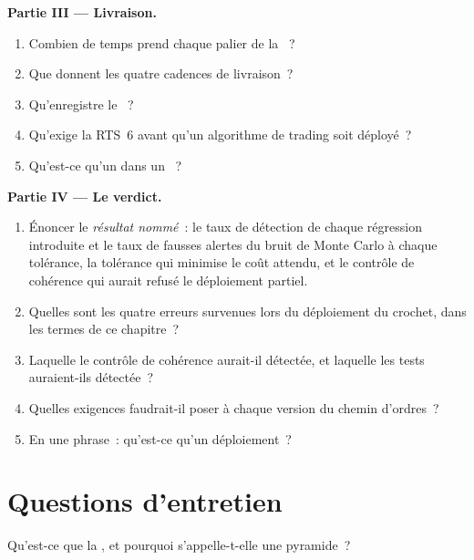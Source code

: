 \begin{problem}
\medskip\noindent\textbf{Partie III --- Livraison.}
\begin{enumerate}[resume]
\item Combien de temps prend chaque palier de la ~?
\item Que donnent les quatre cadences de livraison~?
\item Qu'enregistre le ~?
\item Qu'exige la RTS~6 avant qu'un algorithme de trading soit déployé~?
\item Qu'est-ce qu'un  dans un ~?
\end{enumerate}

\medskip\noindent\textbf{Partie IV --- Le verdict.}
\begin{enumerate}[resume]
\item Énoncer le \emph{résultat nommé}~: le taux de détection de chaque régression introduite et le taux de fausses alertes du bruit de Monte Carlo à chaque
tolérance, la tolérance qui minimise le coût attendu, et le contrôle de cohérence qui aurait refusé le déploiement partiel.
\item Quelles sont les quatre erreurs survenues lors du déploiement du crochet, dans les termes de ce chapitre~?
\item Laquelle le contrôle de cohérence aurait-il détectée, et laquelle les tests auraient-ils détectée~?
\item Quelles exigences faudrait-il poser à chaque version du chemin d'ordres~?
\item En une phrase~: qu'est-ce qu'un déploiement~?
\end{enumerate}
\end{problem}

\section{Questions d'entretien}

\begin{interviewq}\label{iq:pl:testing-and-continuous-delivery:1}
Qu'est-ce que la , et pourquoi s'appelle-t-elle une pyramide~?
\end{interviewq}


